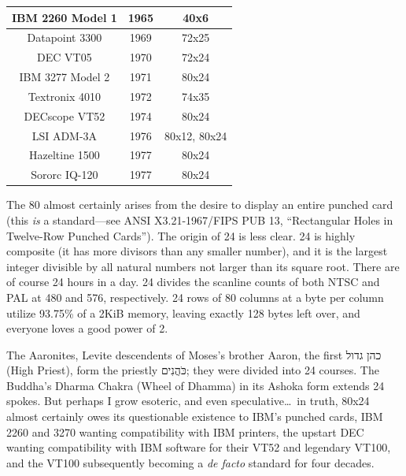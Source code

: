 \documentclass[letterpaper,10pt]{article}
\begin{document}
\begin{appendices}
\vspace{.25in}

\begin{center}
  \begin{tabular}{ |c|c|c| }
    \hline
    IBM 2260 Model 1 & 1965 & 40x6 \\
    \hline
    Datapoint 3300 & 1969 & 72x25 \\
    \hline
    DEC VT05 & 1970 & 72x24 \\
    \hline
    IBM 3277 Model 2 & 1971 & 80x24 \\
    \hline
    Textronix 4010 & 1972 & 74x35 \\
    \hline
    DECscope VT52 & 1974 & 80x24 \\
    \hline
    LSI ADM-3A & 1976 & 80x12, 80x24 \\
    \hline
    Hazeltine 1500 & 1977 & 80x24 \\
    \hline
    Sororc IQ-120 & 1977 & 80x24 \\
    \hline
  \end{tabular}
\end{center}

\vspace{.25in}

The 80 almost certainly arises from the desire to display an entire punched card
(this \textit{is} a standard---see ANSI X3.21-1967/FIPS PUB 13, ``Rectangular
Holes in Twelve-Row Punched Cards'')\cite{sonicdelay}. The origin of 24 is less
clear. 24 is highly composite (it has more divisors than any smaller number),
and it is the largest integer divisible by all natural numbers not larger than its
square root. There are of course 24 hours in a day. 24 divides the scanline
counts of both NTSC and PAL at 480 and 576, respectively. 24 rows of
80 columns at a byte per column utilize 93.75\% of a 2KiB memory, leaving exactly
128 bytes left over, and everyone loves a good power of 2.

The Aaronites, Levite descendents of Moses's brother Aaron, the first
\texthebrew{כהן גדול}
(High Priest),
form the priestly \texthebrew{כֹּהֲנִים}; they were divided into 24 courses. The Buddha's Dharma Chakra (Wheel of Dhamma)
in its Ashoka form extends 24 spokes. But perhaps I grow esoteric, and even
speculative\ldots\ in truth, 80x24 almost certainly owes its questionable
existence to IBM's punched cards, IBM 2260 and 3270 wanting compatibility with
IBM printers, the upstart DEC wanting compatibility with IBM software for their
VT52 and legendary VT100, and the VT100 subsequently becoming a \textit{de facto} standard for
four decades.


\end{appendices}
\end{document}
